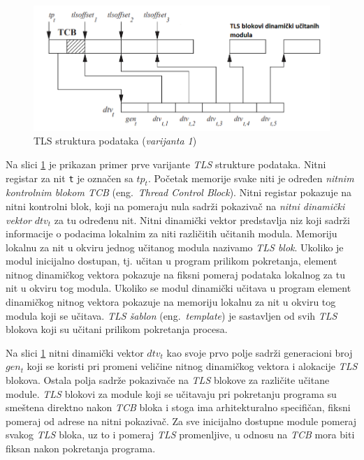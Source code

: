 \documentclass[12pt,oneside]{memoir}
\begin{document}
\begin{figure}[h!]
	\begin{center}
		\includegraphics[scale=0.6]{slike/TLSModelV1.png}
	\end{center}
	\caption{TLS struktura podataka (\emph{varijanta 1})}
	\label{fig:tls_model1}
\end{figure}

Na slici \ref{fig:tls_model1} je prikazan primer prve varijante \emph{TLS} strukture podataka. Nitni registar za nit \texttt{t} je označen sa \texttt{$tp_t$}. Početak  memorije svake niti je određen \emph{nitnim kontrolnim blokom \emph{TCB}} (eng.~\emph{Thread Control Block}). Nitni registar pokazuje na nitni kontrolni blok, koji na pomeraju nula sadrži pokazivač na \emph{nitni dinamički vektor} \texttt{$dtv_t$} za tu određenu nit. Nitni dinamički vektor predstavlja niz koji sadrži informacije o podacima lokalnim za niti različitih učitanih modula. Memoriju lokalnu za nit u okviru jednog učitanog modula nazivamo \emph{TLS blok}. Ukoliko je modul inicijalno dostupan, tj. učitan u program prilikom pokretanja, element nitnog dinamičkog vektora pokazuje na fiksni pomeraj podataka lokalnog za tu nit u okviru tog modula. Ukoliko se modul dinamički učitava u program element dinamičkog nitnog vektora pokazuje na memoriju lokalnu za nit u okviru tog modula koji se učitava. \emph{TLS šablon} (eng.~\emph{template}) je sastavljen od svih \emph{TLS} blokova koji su učitani prilikom pokretanja procesa.

Na slici \ref{fig:tls_model1} nitni dinamički vektor \texttt{$dtv_t$} kao svoje prvo polje sadrži generacioni broj \texttt{$gen_t$} koji se koristi pri promeni veličine nitnog dinamičkog vektora i alokacije \emph{TLS} blokova. Ostala polja sadrže pokazivače na \emph{TLS} blokove za različite učitane module. \emph{TLS} blokovi za module koji se učitavaju pri pokretanju programa su smeštena direktno nakon \emph{TCB} bloka i stoga ima arhitekturalno specifičan, fiksni pomeraj od adrese na nitni pokazivač. Za sve inicijalno dostupne module pomeraj svakog \emph{TLS} bloka, uz to i pomeraj \emph{TLS} promenljive, u odnosu na \emph{TCB} mora biti fiksan nakon pokretanja programa.
\end{document}
